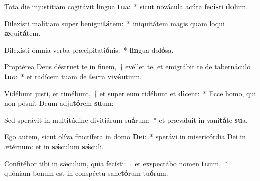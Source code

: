 \item Tota die injustítiam cogitávit lingua \textbf{tu}a:~* sicut novácula acúta fe\textbf{cís}ti \textbf{do}lum.
\item Dilexísti malítiam super benigni\textbf{tá}tem:~* iniquitátem magis quam loqui \textbf{æ}qui\textbf{tá}tem.
\item Dilexísti ómnia verba præcipitati\textbf{ó}nis:~* \textbf{lin}gua do\textbf{ló}sa.
\item Proptérea Deus déstruet te in finem,~† evéllet te, et emigrábit te de tabernáculo \textbf{tu}o:~* et radícem tuam de \textbf{ter}ra vi\textbf{vén}tium.
\item Vidébunt justi, et timébunt,~† et super eum ridébunt et \textbf{di}cent:~* Ecce homo, qui non pósuit Deum adju\textbf{tó}rem \textbf{su}um:
\item Sed sperávit in multitúdine divitiárum su\textbf{á}rum:~* et præváluit in vani\textbf{tá}te \textbf{su}a.
\item Ego autem, sicut olíva fructífera in domo \textbf{De}i:~* sperávi in misericórdia Dei in ætérnum: et in \textbf{sǽ}culum \textbf{sǽ}culi.
\item Confitébor tibi in sǽculum, quia fecísti:~† et exspectábo nomen \textbf{tu}um,~* quóniam bonum est in conspéctu sanc\textbf{tó}rum tu\textbf{ó}rum.

